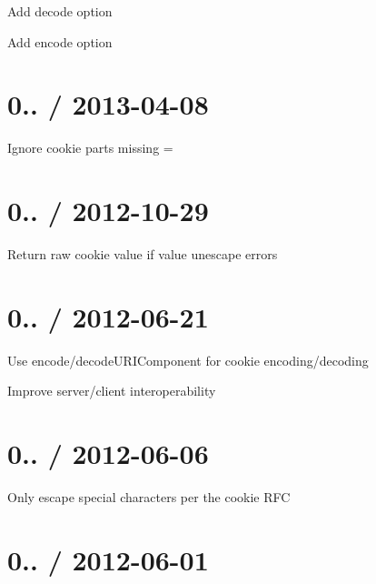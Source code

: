 \begin{DoxyItemize}
\item Add {\ttfamily decode} option
\item Add {\ttfamily encode} option
\end{DoxyItemize}

\section*{0.. / 2013-\/04-\/08 }


\begin{DoxyItemize}
\item Ignore cookie parts missing {\ttfamily =}
\end{DoxyItemize}

\section*{0.. / 2012-\/10-\/29 }


\begin{DoxyItemize}
\item Return raw cookie value if value unescape errors
\end{DoxyItemize}

\section*{0.. / 2012-\/06-\/21 }


\begin{DoxyItemize}
\item Use encode/decode\+U\+R\+I\+Component for cookie encoding/decoding
\begin{DoxyItemize}
\item Improve server/client interoperability
\end{DoxyItemize}
\end{DoxyItemize}

\section*{0.. / 2012-\/06-\/06 }


\begin{DoxyItemize}
\item Only escape special characters per the cookie R\+FC
\end{DoxyItemize}

\section*{0.. / 2012-\/06-\/01 }


